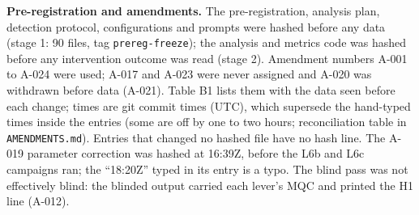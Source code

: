 \documentclass[11pt,a4paper]{article}
\begin{document}
\textbf{Pre-registration and amendments.} The pre-registration, analysis plan, detection protocol, configurations and prompts were hashed before any data (stage 1: 90 files, tag \texttt{prereg-\allowbreak{}freeze}); the analysis and metrics code was hashed before any intervention outcome was read (stage 2). Amendment numbers A-001 to A-024 were used; A-017 and A-023 were never assigned and A-020 was withdrawn before data (A-021). Table B1 lists them with the data seen before each change; times are git commit times (UTC), which supersede the hand-typed times inside the entries (some are off by one to two hours; reconciliation table in \texttt{AMENDMENTS.\allowbreak{}md}). Entries that changed no hashed file have no hash line. The A-019 parameter correction was hashed at 16:39Z, before the L6b and L6c campaigns ran; the ``18:20Z'' typed in its entry is a typo. The blind pass was not effectively blind: the blinded output carried each lever's MQC and printed the H1 line (A-012).
\end{document}
